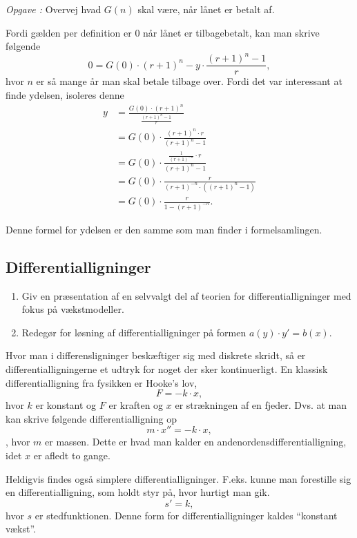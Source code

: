 \documentclass{article}
\newcounter{opgavecnt}
\newcommand{\opg}[1]{\stepcounter{opgavecnt}\textit{Opgave \arabic{opgavecnt}: }#1}
\begin{document}
\smallskip
\opg{Overvej hvad $G(n)$ skal være, når lånet er betalt af.}
\smallskip

Fordi gælden per definition er 0 når lånet er tilbagebetalt, kan man skrive
følgende
\[
	0 = G(0) \cdot (r + 1)^n - y \cdot \frac{(r + 1)^n - 1}{r},
\] 
hvor $n$ er så mange år man skal betale tilbage over. Fordi det var interessant
at finde ydelsen, isoleres denne
\begin{align*}
	y &= \frac{G(0) \cdot (r + 1)^n}{\frac{(r + 1)^n - 1}{r}}\\
	  &= G(0) \cdot \frac{(r + 1)^n \cdot r}{(r + 1)^n - 1}\\
	  &= G(0) \cdot \frac{\frac{1}{(r+1)^{-n}} \cdot r}{(r + 1)^n - 1}\\
	  &= G(0) \cdot \frac{r}{(r+1)^{-n} \cdot ((r + 1)^n - 1)}\\
	  &= G(0) \cdot \frac{r}{1 - (r+1)^{-n}}.
\end{align*}

Denne formel for ydelsen er den samme som man finder i formelsamlingen.

\begin{tcolorbox}
	\section{Differentialligninger}
	\tcblower
	\begin{enumerate}
		\item Giv en præsentation af en selvvalgt del af teorien for
			differentialligninger med fokus på vækstmodeller.
		\item Redegør for løsning af differentialligninger på formen $a(y)
			\cdot y' = b(x)$. 
	\end{enumerate}
\end{tcolorbox}

Hvor man i differensligninger beskæftiger sig med diskrete skridt, så er
differentialligningerne et udtryk for noget der sker kontinuerligt. En klassisk
differentialligning fra fysikken er Hooke's lov,
\[
	F = -k \cdot x,
\] 
hvor $k$ er konstant og $F$ er kraften og $x$ er strækningen af en fjeder. Dvs.
at man kan skrive følgende differentialligning op
\[
	m \cdot x'' = -k \cdot x,
\],
hvor $m$ er massen. Dette er hvad man kalder en andenordensdifferentialligning,
idet $x$ er afledt to gange.

Heldigvis findes også simplere differentialligninger. F.eks. kunne man
forestille sig en differentialligning, som holdt styr på, hvor hurtigt man gik.
\[
	s' = k,
\]
hvor $s$ er stedfunktionen. Denne form for differentialligninger kaldes
``konstant vækst''.
\end{document}
